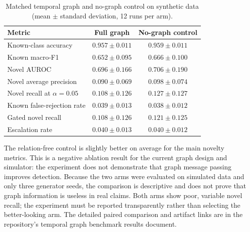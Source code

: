 \documentclass[conference]{IEEEtran}
\begin{document}
\begin{table}[t]
\caption{Matched temporal graph and no-graph control on synthetic data (mean $\pm$ standard deviation, 12 runs per arm).}
\label{tab:graph_ablation}
\centering
\small
\begin{tabular}{lcc}
\toprule
Metric & Full graph & No-graph control\\
\midrule
Known-class accuracy & $0.957\pm0.011$ & $0.959\pm0.011$\\
Known macro-F1 & $0.652\pm0.095$ & $0.666\pm0.100$\\
Novel AUROC & $0.696\pm0.166$ & $0.706\pm0.190$\\
Novel average precision & $0.090\pm0.069$ & $0.098\pm0.074$\\
Novel recall at $\alpha=0.05$ & $0.108\pm0.126$ & $0.127\pm0.127$\\
Known false-rejection rate & $0.039\pm0.013$ & $0.038\pm0.012$\\
Gated novel recall & $0.108\pm0.126$ & $0.121\pm0.125$\\
Escalation rate & $0.040\pm0.013$ & $0.040\pm0.012$\\
\bottomrule
\end{tabular}
\end{table}

The relation-free control is slightly better on average for the main novelty metrics. This is a negative ablation result for the current graph design and simulator: the experiment does not demonstrate that graph message passing improves detection. Because the two arms were evaluated on simulated data and only three generator seeds, the comparison is descriptive and does not prove that graph information is useless in real claims. Both arms show poor, variable novel recall; the experiment must be reported transparently rather than selecting the better-looking arm. The detailed paired comparison and artifact links are in the repository's temporal graph benchmark results document.
\end{document}
